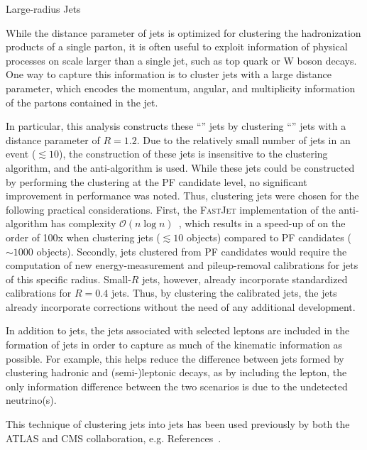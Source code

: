 \begin{section}{Large-radius Jets}

While the distance parameter of \smallR jets is optimized for clustering the hadronization products of a single parton, it is often useful to exploit information of physical processes on scale larger than a single jet, such as top quark or W boson decays.
One way to capture this information is to cluster jets with a large distance parameter, which encodes the momentum, angular, and multiplicity information of the partons contained in the jet.

In particular, this analysis constructs these ``\largeR'' jets by clustering ``\smallR'' jets with a distance parameter of $R = 1.2$.
Due to the relatively small number of \smallR jets in an event ($\lesssim 10$), the construction of these \largeR jets is insensitive to the clustering algorithm, and the anti-\kT algorithm is used.
While these \largeR jets could be constructed by performing the clustering at the PF candidate level, no significant improvement in performance was noted.
Thus, clustering \smallR jets were chosen for the following practical considerations.
First, the \textsc{FastJet} implementation of the anti-\kT algorithm has complexity $\mathcal{O}(n\log n)$~\cite{Cacciari:2005hq}, which results in a speed-up of on the order of 100x when clustering \smallR jets ($\lesssim 10$ objects) compared to PF candidates ($\sim 1000$ objects).
Secondly, \largeR jets clustered from PF candidates would require the computation of new energy-measurement and pileup-removal calibrations for jets of this specific radius.
Small-$R$ jets, however, already incorporate standardized calibrations for $R = 0.4$ jets.
Thus, by clustering the calibrated \smallR jets, the \largeR jets already incorporate corrections without the need of any additional development.

In addition to \smallR jets, the jets associated with selected leptons are included in the formation of \largeR jets in order to capture as much of the kinematic information as possible.
For example, this helps reduce the difference between \largeR jets formed by clustering hadronic and (semi-)leptonic decays, as by including the lepton, the only information difference between the two scenarios is due to the undetected neutrino(s).

This technique of clustering \smallR jets into \largeR jets has been used previously by both the ATLAS and CMS collaboration, e.g. References~\cite{Aaboud:2017aeu,Khachatryan:2016uwr}.

\end{section}
